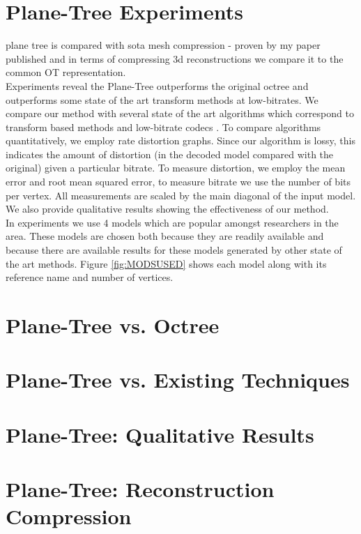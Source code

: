 \section{Plane-Tree Experiments}


plane tree is compared with sota mesh compression - proven by my paper published and in terms of compressing 3d reconstructions we compare it to the common OT representation. \\

Experiments reveal the Plane-Tree outperforms the original octree and outperforms some state of the art transform methods at low-bitrates. We compare our method with several state of the art algorithms which correspond to transform based methods \cite{Khodakovsky00Progressive,Bayazit103DMesh} and low-bitrate codecs \cite{Peng10Feature}. To compare algorithms quantitatively, we employ rate distortion graphs. Since our algorithm is lossy, this indicates the amount of distortion (in the decoded model compared with the original) given a particular bitrate. To measure distortion, we employ the mean error and root mean squared error, to measure bitrate we use the number of bits per vertex. All measurements are scaled by the main diagonal of the input model. We also provide qualitative results showing the effectiveness of our method. \\

In experiments we use 4 models which are popular amongst researchers in the area. These models are chosen both because they are readily available and because there are available results for these models generated by other state of the art methods. Figure \ref{fig:MODSUSED} shows each model along with its reference name and number of vertices. \\

\section{Plane-Tree vs. Octree}

\section{Plane-Tree vs. Existing Techniques}

\section{Plane-Tree: Qualitative Results}

\section{Plane-Tree: Reconstruction Compression}




